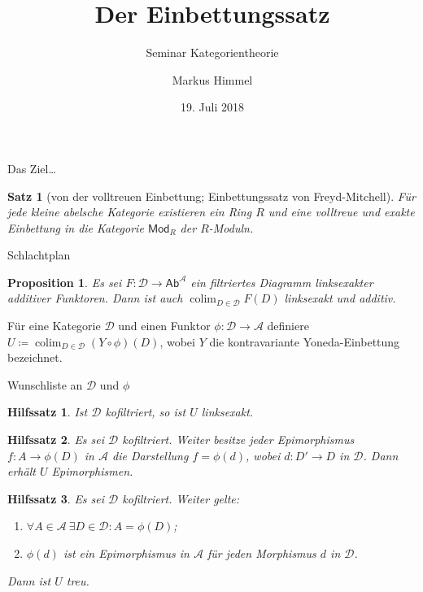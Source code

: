 \documentclass[usenames, dvipsnames]{beamer}
\title{Der Einbettungssatz}
\subtitle{Seminar Kategorientheorie}
\author{Markus Himmel}
\date{19. Juli 2018}
\newtheorem{proposition}{Proposition}
\newtheorem{hilfssatz}{Hilfssatz}
\newtheorem{satz}{Satz}
\newcommand\ccat\mathsf
\newcommand\cat\mathcal
\DeclareMathOperator{\colim}{colim}
\begin{document}
	\begin{frame}
		\maketitle
	\end{frame}
	\begin{frame}{Das Ziel\ldots}
		\begin{satz}[von der volltreuen Einbettung; Einbettungssatz von Freyd-Mitchell]
			Für jede kleine abelsche Kategorie existieren ein Ring $R$ und eine volltreue
			und exakte Einbettung in die Kategorie $\ccat{Mod}_R$ der $R$-Moduln.
		\end{satz}
	\end{frame}
	\begin{frame}{Schlachtplan}
		\begin{proposition}
			Es sei $F\colon\cat{D}\to\ccat{Ab}^{\cat{A}}$ ein filtriertes Diagramm
			linksexakter additiver Funktoren. Dann ist auch $\colim_{D\in\cat{D}} F(D)$
			linksexakt und additiv.
		\end{proposition}\pause
		\begin{definition}[Die Einbettung in $\ccat{Ab}$]
			Für eine Kategorie $\cat{D}$ und einen Funktor $\phi\colon\cat{D}\to\cat{A}$
			definiere $U\coloneqq\colim_{D\in\cat{D}} (Y\circ\phi)(D)$, wobei $Y$ die
			kontravariante Yoneda-Einbettung bezeichnet.
		\end{definition}
	\end{frame}
	\begin{frame}{Wunschliste an $\cat{D}$ und $\phi$}
		\begin{hilfssatz}
			Ist $\cat{D}$ kofiltriert, so ist $U$ linksexakt.
		\end{hilfssatz}\pause
		\begin{hilfssatz}
			Es sei $\cat{D}$ kofiltriert. Weiter besitze jeder Epimorphismus
			$f\colon A\to\phi(D)$ in $\cat{A}$ die Darstellung $f = \phi(d)$, wobei
			$d\colon D'\to D$ in $\cat{D}$. Dann erhält $U$ Epimorphismen.
		\end{hilfssatz}\pause
		\begin{hilfssatz}
			Es sei $\cat{D}$ kofiltriert. Weiter gelte:
			\begin{enumerate}
				\item $\forall A\in\cat{A}\ \exists D\in\cat{D}: A=\phi(D)$;
				\item $\phi(d)$ ist ein Epimorphismus in $\cat{A}$ für jeden Morphismus $d$ in $\cat{D}$.
			\end{enumerate}
			Dann ist $U$ treu.
		\end{hilfssatz}
	\end{frame}
\end{document}
